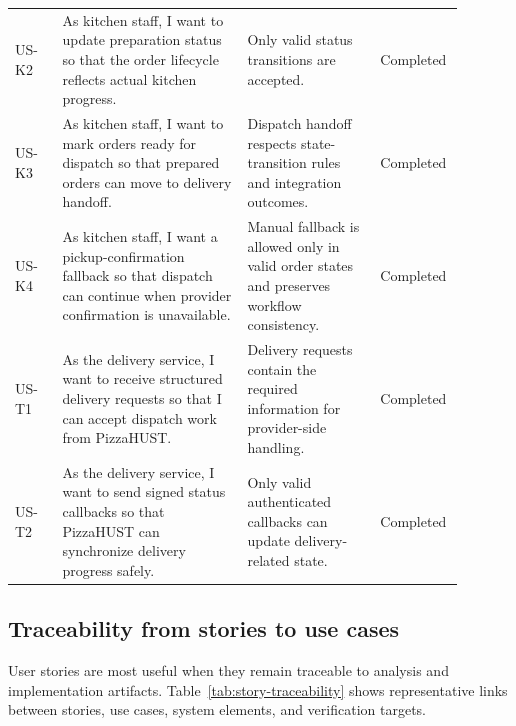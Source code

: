 \begin{longtable}{L{0.10\linewidth} L{0.39\linewidth} L{0.28\linewidth} L{0.12\linewidth}}
US-K2 & As kitchen staff, I want to update preparation status so that the order lifecycle reflects actual kitchen progress. & Only valid status transitions are accepted. & Completed \\
US-K3 & As kitchen staff, I want to mark orders ready for dispatch so that prepared orders can move to delivery handoff. & Dispatch handoff respects state-transition rules and integration outcomes. & Completed \\
US-K4 & As kitchen staff, I want a pickup-confirmation fallback so that dispatch can continue when provider confirmation is unavailable. & Manual fallback is allowed only in valid order states and preserves workflow consistency. & Completed \\
US-T1 & As the delivery service, I want to receive structured delivery requests so that I can accept dispatch work from PizzaHUST. & Delivery requests contain the required information for provider-side handling. & Completed \\
US-T2 & As the delivery service, I want to send signed status callbacks so that PizzaHUST can synchronize delivery progress safely. & Only valid authenticated callbacks can update delivery-related state. & Completed \\
\end{longtable}
\endgroup

\subsection{Traceability from stories to use cases}

User stories are most useful when they remain traceable to analysis and implementation artifacts. Table~\ref{tab:story-traceability} shows representative links between stories, use cases, system elements, and verification targets.

